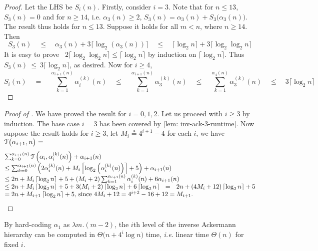 \begin{proof}
	Let the LHS be $S_i(n)$. Firstly, consider $i = 3$. Note that for $n\le 13$, $S_3(n) = 0$ and for $n\ge 14$, i.e. $\alpha_3(n)\ge 2$, $S_3(n) = \alpha_3(n) + S_3\big(\alpha_3(n)\big)$. The result thus holds for $n\le 13$. Suppose it holds for all $m < n$, where $n\ge 14$. Then
	\begin{equation*}
	S_3(n) \quad \le \quad \alpha_3(n) + 3\big\lceil \log_2(\alpha_3(n)) \big\rceil \quad \le \quad \big\lceil \log_2n \big\rceil + 3\big\lceil \log_2\log_2n \big\rceil
	\end{equation*}
	It is easy to prove \, $2\big\lceil \log_2\log_2n \big\rceil \le \big\lceil \log_2n \big\rceil$ by induction on $\big\lceil \log_2n \big\rceil$. Thus $S_3(n)~\le~3\big\lceil \log_2n \big\rceil$, as desired. Now for $i \ge 4$,
	\begin{equation*}
	S_i(n) \quad = \quad \sum_{k=1}^{\alpha_{i+1}(n)} \alpha_i^{(k)}(n) \quad \le \quad
	\sum_{k=1}^{\alpha_{i+1}(n)} \alpha_3^{(k)}(n) \quad \le \quad
	\sum_{k=1}^{\alpha_{4}(n)} \alpha_3^{(k)}(n) \quad \le \quad
	3\big\lceil \log_2n \big\rceil
	\end{equation*}
\end{proof}
\begin{proof}[Proof of ]
	We have proved the result for $i = 0, 1, 2$. Let us proceed with $i\ge 3$ by induction. The base case $i = 3$ has been covered by \cref{lem: inv-ack-3-runtime}. Now suppose the result holds for $i\ge 3$, let $M_i \triangleq 4^{i+1}-4$ for each $i$, we have $\mathcal{T}\big(\alpha_{i+1}, n\big) = $
	\begin{equation*}
	\begin{array}{@{}l@{}}
	 \sum_{k=0}^{\alpha_{i+1}(n)} \runtime\left(\alpha_i, \alpha_i^{(k)}(n)\right) + \alpha_{i+1}(n) \\
	\le \sum_{k=0}^{\alpha_{i+1}(n)}\left(2\alpha_i^{(k)}(n) + M_i\left\lceil\log_2\left(\alpha_i^{(k)}(n)\right)\right\rceil + 5 \right) + \alpha_{i+1}(n) \\
	\le 2n + M_i\left\lceil\log_2n\right\rceil + 5 + (M_i+2)\sum_{k=1}^{\alpha_{i+1}(n)}\alpha_i^{(k)}(n) + 6\alpha_{i+1}(n) \\
	\le 2n + M_i\left\lceil\log_2n\right\rceil + 5 +
	3(M_i + 2)\left\lceil\log_2n\right\rceil + 6\left\lceil\log_2n\right\rceil ~~
	= ~~ 2n + (4M_i + 12)\left\lceil\log_2n\right\rceil + 5 \\
	= 2n + M_{i+1}\left\lceil\log_2n\right\rceil + 5\text{, since $4M_i + 12 = 4^{i+2} - 16 + 12 = M_{i+1}$}.
	\end{array}
	\end{equation*}
\end{proof}
By hard-coding $\alpha_1$ as $\lambda m.(m-2)$, the $i$th level of the inverse Ackermann hierarchy can be computed in $\Theta\big(n + 4^i\log n\big)$ time, \emph{i.e.} linear time $\Theta(n)$ for fixed $i$.

